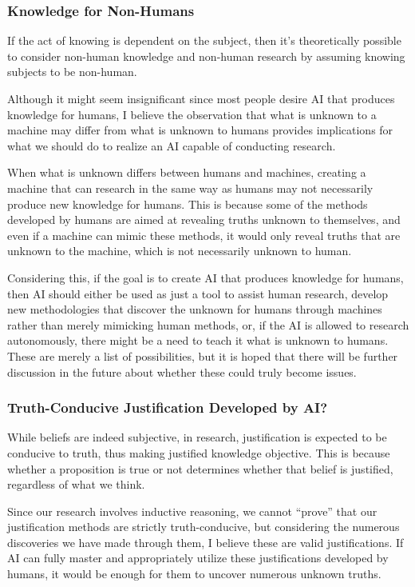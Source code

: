 \subsubsection{Knowledge for Non-Humans}
If the act of knowing is dependent on the subject, then it's theoretically possible to consider non-human knowledge and non-human research by assuming knowing subjects to be non-human. 

Although it might seem insignificant since most people desire AI that produces knowledge for humans, I believe the observation that what is unknown to a machine may differ from what is unknown to humans provides implications for what we should do to realize an AI capable of conducting research.

When what is unknown differs between humans and machines, creating a machine that can research in the same way as humans may not necessarily produce new knowledge for humans. This is because some of the methods developed by humans are aimed at revealing truths unknown to themselves, and even if a machine can mimic these methods, it would only reveal truths that are unknown to the machine, which is not necessarily unknown to human.

Considering this, if the goal is to create AI that produces knowledge for humans, then AI should either be used as just a tool to assist human research, develop new methodologies that discover the unknown for humans through machines rather than merely mimicking human methods, or, if the AI is allowed to research autonomously, there might be a need to teach it what is unknown to humans. These are merely a list of possibilities, but it is hoped that there will be further discussion in the future about whether these could truly become issues.


\subsubsection{Truth-Conducive Justification Developed by AI?}

While beliefs are indeed subjective, in research, justification is expected to be conducive to truth, thus making justified knowledge objective. This is because whether a proposition is true or not determines whether that belief is justified, regardless of what we think.

Since our research involves inductive reasoning, we cannot ``prove'' that our justification methods are strictly truth-conducive, but considering the numerous discoveries we have made through them, I believe these are valid justifications. If AI can fully master and appropriately utilize these justifications developed by humans, it would be enough for them to uncover numerous unknown truths.

